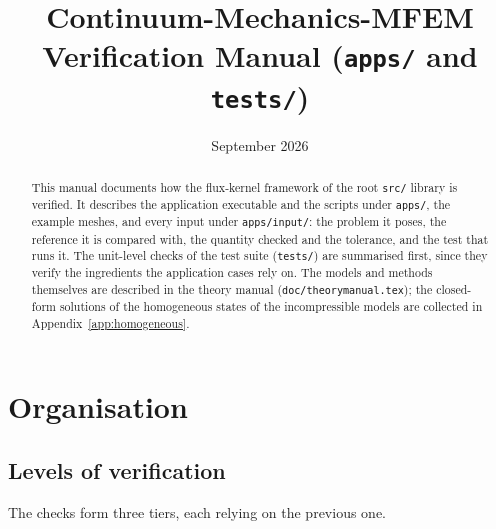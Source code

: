 \documentclass[11pt]{article}
\title{Continuum-Mechanics-MFEM\\[4pt]
\large Verification Manual (\texttt{apps/} and \texttt{tests/})}
\author{}
\date{September 2026}
\DeclareRobustCommand{\file}[1]{{\def\_{\textunderscore\allowbreak}\texttt{#1}}}
\begin{document}
\maketitle

\begin{abstract}
\noindent
This manual documents how the flux-kernel framework of the root \file{src/}
library is verified.  It describes the application executable and the
scripts under \file{apps/}, the example meshes, and every input under
\file{apps/input/}: the problem it poses, the reference it is compared
with, the quantity checked and the tolerance, and the test that runs it.
The unit-level checks of the test suite (\file{tests/}) are summarised
first, since they verify the ingredients the application cases rely on.
The models and methods themselves are described in the theory manual
(\file{doc/theory\_manual.tex}); the closed-form solutions of the
homogeneous states of the incompressible models are collected in
Appendix~\ref{app:homogeneous}.
\end{abstract}

\tableofcontents

\section{Organisation}

\subsection{Levels of verification}

The checks form three tiers, each relying on the previous one.
\end{document}

